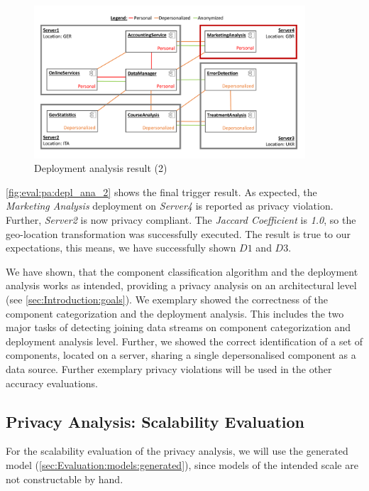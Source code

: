 \begin{figure}[h]
	\centering
	\includegraphics[trim = 0mm 10mm 0mm 10mm, clip, width=0.90\textwidth]{graphs/medSys_eval_pa_da_2}
	\caption{Deployment analysis result (2)}
	\label{fig:eval:pa:depl_ana_2}
\end{figure}

\autoref{fig:eval:pa:depl_ana_2} shows the final trigger result. As expected, the \textit{Marketing Analysis} deployment on \textit{Server4} is reported as privacy violation. Further, \textit{Server2} is now privacy compliant. The \textit{Jaccard Coefficient} is \textit{1.0}, so the geo-location transformation was successfully executed. The result is true to our expectations, this means, we have successfully shown $D1$ and $D3$.

We have shown, that the component classification algorithm and the deployment analysis works as intended, providing a privacy analysis on an architectural level (see \autoref{sec:Introduction:goals}). We exemplary showed the correctness of the component categorization and the deployment analysis. This includes the two major tasks of detecting joining data streams on component categorization and deployment analysis level. Further, we showed the correct identification of a set of components, located on a server, sharing a single depersonalised component as a data source. Further exemplary privacy violations will be used in the other accuracy evaluations.

\subsection{Privacy Analysis: Scalability Evaluation}
\label{sec:Evaluation:privacyanalysis:scale}

For the scalability evaluation of the privacy analysis, we will use the generated model (\autoref{sec:Evaluation:models:generated}), since models of the intended scale are not constructable by hand.

